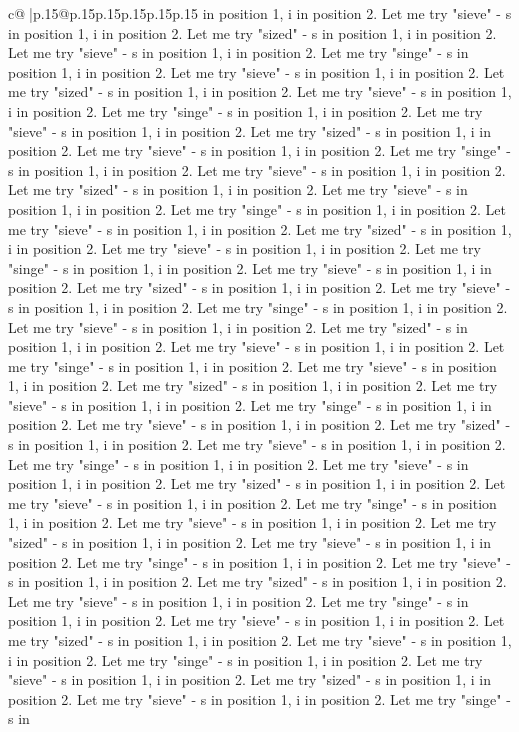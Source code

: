 \documentclass{article}
\begin{document}
{\begin{supertabular}{c@{$\;$}|p{.15\linewidth}@{}p{.15\linewidth}p{.15\linewidth}p{.15\linewidth}p{.15\linewidth}p{.15\linewidth}}
{{{in position 1, i in position 2. Let me try "sieve" {-} s in position 1, i in position 2. Let me try "sized" {-} s in position 1, i in position 2. Let me try "sieve" {-} s in position 1, i in position 2. Let me try "singe" {-} s in position 1, i in position 2. Let me try "sieve" {-} s in position 1, i in position 2. Let me try "sized" {-} s in position 1, i in position 2. Let me try "sieve" {-} s in position 1, i in position 2. Let me try "singe" {-} s in position 1, i in position 2. Let me try "sieve" {-} s in position 1, i in position 2. Let me try "sized" {-} s in position 1, i in position 2. Let me try "sieve" {-} s in position 1, i in position 2. Let me try "singe" {-} s in position 1, i in position 2. Let me try "sieve" {-} s in position 1, i in position 2. Let me try "sized" {-} s in position 1, i in position 2. Let me try "sieve" {-} s in position 1, i in position 2. Let me try "singe" {-} s in position 1, i in position 2. Let me try "sieve" {-} s in position 1, i in position 2. Let me try "sized" {-} s in position 1, i in position 2. Let me try "sieve" {-} s in position 1, i in position 2. Let me try "singe" {-} s in position 1, i in position 2. Let me try "sieve" {-} s in position 1, i in position 2. Let me try "sized" {-} s in position 1, i in position 2. Let me try "sieve" {-} s in position 1, i in position 2. Let me try "singe" {-} s in position 1, i in position 2. Let me try "sieve" {-} s in position 1, i in position 2. Let me try "sized" {-} s in position 1, i in position 2. Let me try "sieve" {-} s in position 1, i in position 2. Let me try "singe" {-} s in position 1, i in position 2. Let me try "sieve" {-} s in position 1, i in position 2. Let me try "sized" {-} s in position 1, i in position 2. Let me try "sieve" {-} s in position 1, i in position 2. Let me try "singe" {-} s in position 1, i in position 2. Let me try "sieve" {-} s in position 1, i in position 2. Let me try "sized" {-} s in position 1, i in position 2. Let me try "sieve" {-} s in position 1, i in position 2. Let me try "singe" {-} s in position 1, i in position 2. Let me try "sieve" {-} s in position 1, i in position 2. Let me try "sized" {-} s in position 1, i in position 2. Let me try "sieve" {-} s in position 1, i in position 2. Let me try "singe" {-} s in position 1, i in position 2. Let me try "sieve" {-} s in position 1, i in position 2. Let me try "sized" {-} s in position 1, i in position 2. Let me try "sieve" {-} s in position 1, i in position 2. Let me try "singe" {-} s in position 1, i in position 2. Let me try "sieve" {-} s in position 1, i in position 2. Let me try "sized" {-} s in position 1, i in position 2. Let me try "sieve" {-} s in position 1, i in position 2. Let me try "singe" {-} s in position 1, i in position 2. Let me try "sieve" {-} s in position 1, i in position 2. Let me try "sized" {-} s in position 1, i in position 2. Let me try "sieve" {-} s in position 1, i in position 2. Let me try "singe" {-} s in position 1, i in position 2. Let me try "sieve" {-} s in position 1, i in position 2. Let me try "sized" {-} s in position 1, i in position 2. Let me try "sieve" {-} s in position 1, i in position 2. Let me try "singe" {-} s in }}}
\end{supertabular}}
\end{document}
